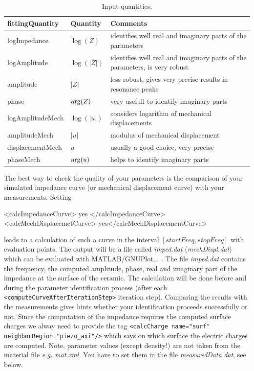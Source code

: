 \begin{table}
\begin{center}
\caption{Input quantities.}
\label{TableFittingQuantity}
\vspace{0.5cm}
\begin{tabular}{llp{}}
\toprule
 {\bf fittingQuantity} & {\bf Quantity } & {\bf Comments}\\ 
\midrule
logImpedance & $\log(Z)$ & identifies well real and imaginary parts of the
parameters \\ \midrule
logAmplitude & $\log(|Z|)$ & identifies well real and imaginary parts of the
parameters, is very robust \\ 
\midrule
amplitude & $|Z|$ & less robust, gives very precise results in resonance peaks
\\
\midrule
phase & ${\rm arg}(Z)$ & very usefull to identify imaginary parts \\
\midrule
logAmplitudeMech & $\log(|u|)$ & considers logarithm of mechanical displacements
\\
\midrule
amplitudeMech & $|u|$ & modulus of mechanical displacement \\
\midrule
displacementMech & $u$ & usually a good choice, very precise \\
\midrule
phaseMech & ${\rm arg}(u)$ & helps to identify imaginary parts \\
\bottomrule
\end{tabular}
\end{center}
\end{table} 

The best way to check the quality of your parameters is the comparison of your
simulated impedance curve (or mechanical displacement curve) with your
measurements. Setting 
\begin{xmllisting}
  <calcImpedanceCurve> yes </calcImpedanceCurve>
  <calcMechDisplacemetCurve> yes</calcMechDisplacementCurve>
\end{xmllisting}
 leads to a calculation of such a curve in the interval $[startFreq,stopFreq]$
with  evaluation points. The output will be a file called {\em
imped.dat} ({\em mechDispl.dat}) which can be evaluated with MATLAB/GNUPlot,.. .
The file {\em imped.dat} contains the frequency, the computed amplitude, phase,
real and imaginary part of the impedance at the surface of the ceramic.  The
calculation will be done before and during the parameter identification process
(after each  \verb!<computeCurveAfterIterationStep>! iteration step). Comparing
the results with the measurements gives hints whether your identification
proceeds successfully or not.
Since the computation of the impedance requires the computed surface charges we
alway need to provide the tag 
  \verb!<calcCharge name="surf" neighborRegion="piezo_axi"/>! which says on
which surface the electric charges are computed. Note, parameter values (except
density!) are not taken from the material file {\em e.g. mat.xml}. You have to
set them in the file {\em measuredData.dat}, see below.
\\ 


